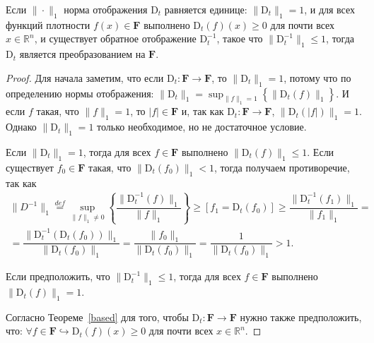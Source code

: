        \begin{theorem} \label{R_to_R}
            Если $\| \cdot \|_1$ норма отображения $\text{D}_t$ равняется единице: $\| \text{D}_t \|_1 = 1$, и для всех функций плотности $f(x) \in \textbf{F}$ выполнено $\text{D}_t(f)(x) \geq 0$ для почти всех $x \in \mathbb{R}^n$, и существует обратное отображение $\text{D}_t^{-1}$, такое что $\|\text{D}_t^{-1}\|_1 \leq 1$, тогда $\text{D}_t$ является преобразованием на $\textbf{F}$.
        \end{theorem}
        \begin{proof}
             Для начала заметим, что если $\text{D}_t: \textbf{F} \to \textbf{F}$, то $\|\text{D}_t\|_1 = 1$, потому что по определению нормы отображения:
            $
                \|\text{D}_t\|_1 = \sup_{\|f\|_1 = 1}\left\{\|\text{D}_t(f)\|_1\right\}.
            $
            И если $f$ такая, что $\|f\|_1 = 1$, то $|f| \in \textbf{F}$ и, так как $\text{D}_t: \textbf{F} \to \textbf{F}$, $\|\text{D}_t(|f|)\|_1 = 1$. Однако $\|\text{D}_t\|_1 = 1$ только необходимое, но не достаточное условие.
    
            Если $\|\text{D}_t\|_1 = 1$, тогда для всех $f \in \textbf{F}$ выполнено $\|\text{D}_t(f)\|_1 \leq 1$. Если существует $f_0 \in \textbf{F}$ такая, что $\|\text{D}_t(f_0)\|_1 < 1$, тогда получаем противоречие, так как
            \begin{multline*}
                \|D^{-1}\|_1 \overset{def}{=} \underset{\|f\|_1 \neq 0}{\sup}\left\{\dfrac{\|\text{D}_t^{-1}(f)\|_1}{\|f\|_1}\right\} 
                \geq \left[f_1 = \text{D}_t(f_0)\right] \geq
                \dfrac{\|\text{D}_t^{-1}(f_1)\|_1}{\|f_1\|_1} = \\ = 
                \dfrac{\|\text{D}_t^{-1}(\text{D}_t(f_0))\|_1}{\|\text{D}_t(f_0)\|_1} = 
                \dfrac{\|f_0\|_1}{\|\text{D}_t(f_0)\|_1} = \dfrac{1}{\|\text{D}_t(f_0)\|_1} > 1.
            \end{multline*}

            Если предположить, что $\|\text{D}_t^{-1}\|_1 \leq 1$, тогда для всех $f \in \textbf{F}$ выполнено $\|\text{D}_t(f)\|_1 = 1$.
    
            Согласно Теореме~\ref{based} для того, чтобы $\text{D}_t : \textbf{F} \to \textbf{F}$ нужно также предположить, что: $\forall f \in \textbf{F} \hookrightarrow \text{D}_t(f)(x) \geq 0$ для почти всех $x \in \mathbb{R}^n$.
        \end{proof}

